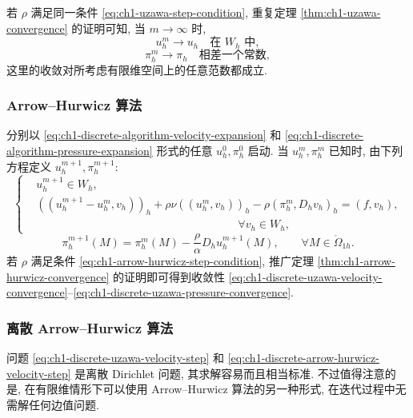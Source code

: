 若 $\rho$ 满足同一条件 \eqref{eq:ch1-uzawa-step-condition}, 重复定理 \ref{thm:ch1-uzawa-convergence} 的证明可知, 当 $m\to\infty$ 时,
\begin{equation}
u_h^m\longrightarrow u_h\quad\text{在 }W_h\text{ 中},
\label{eq:ch1-discrete-uzawa-velocity-convergence}
\end{equation}
\begin{equation}
\pi_h^m\longrightarrow\pi_h\quad\text{相差一个常数},
\label{eq:ch1-discrete-uzawa-pressure-convergence}
\end{equation}
这里的收敛对所考虑有限维空间上的任意范数都成立.

\subsubsection*{Arrow--Hurwicz 算法}

分别以 \eqref{eq:ch1-discrete-algorithm-velocity-expansion} 和 \eqref{eq:ch1-discrete-algorithm-pressure-expansion} 形式的任意 $u_h^0,\pi_h^0$ 启动. 当 $u_h^m,\pi_h^m$ 已知时, 由下列方程定义 $u_h^{m+1},\pi_h^{m+1}$:
\begin{equation}
\left\{
\begin{aligned}
&u_h^{m+1}\in W_h,\\
&((u_h^{m+1}-u_h^m,v_h))_h
+\rho\nu((u_h^m,v_h))_h
-\rho(\pi_h^m,D_hv_h)_h=(f,v_h),\\
&\hspace{18em}\forall v_h\in W_h,
\end{aligned}
\right.
\label{eq:ch1-discrete-arrow-hurwicz-velocity-step}
\end{equation}
\begin{equation}
\pi_h^{m+1}(M)=\pi_h^m(M)
-\frac{\rho}{\alpha}D_hu_h^{m+1}(M),
\qquad\forall M\in\mathring\Omega_{1h}.
\label{eq:ch1-discrete-arrow-hurwicz-pressure-step}
\end{equation}
若 $\rho$ 满足条件 \eqref{eq:ch1-arrow-hurwicz-step-condition}, 推广定理 \ref{thm:ch1-arrow-hurwicz-convergence} 的证明即可得到收敛性 \eqref{eq:ch1-discrete-uzawa-velocity-convergence}--\eqref{eq:ch1-discrete-uzawa-pressure-convergence}.

\subsubsection*{离散 Arrow--Hurwicz 算法}

问题 \eqref{eq:ch1-discrete-uzawa-velocity-step} 和 \eqref{eq:ch1-discrete-arrow-hurwicz-velocity-step} 是离散 Dirichlet 问题, 其求解容易而且相当标准. 不过值得注意的是, 在有限维情形下可以使用 Arrow--Hurwicz 算法的另一种形式, 在迭代过程中无需解任何边值问题.

